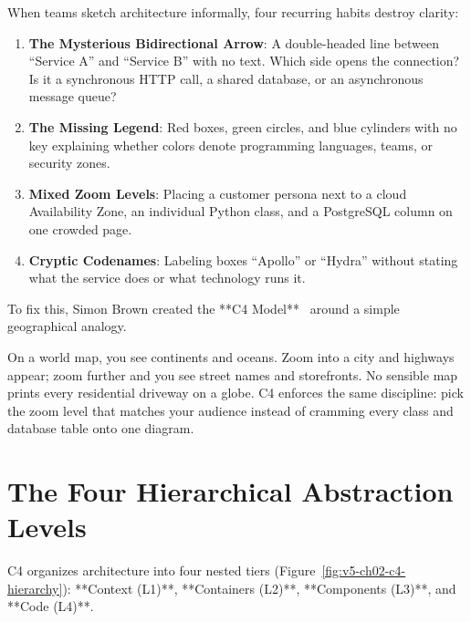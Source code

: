 When teams sketch architecture informally, four recurring habits destroy clarity:
\begin{enumerate}[leftmargin=18pt]
  \item \textbf{The Mysterious Bidirectional Arrow}: A double-headed line between ``Service A'' and ``Service B'' with no text. Which side opens the connection? Is it a synchronous HTTP call, a shared database, or an asynchronous message queue?
  \item \textbf{The Missing Legend}: Red boxes, green circles, and blue cylinders with no key explaining whether colors denote programming languages, teams, or security zones.
  \item \textbf{Mixed Zoom Levels}: Placing a customer persona next to a cloud Availability Zone, an individual Python class, and a PostgreSQL column on one crowded page.
  \item \textbf{Cryptic Codenames}: Labeling boxes ``Apollo'' or ``Hydra'' without stating what the service does or what technology runs it.
\end{enumerate}

To fix this, Simon Brown created the **C4 Model**~\cite{c4model} around a simple geographical analogy.

\begin{intuitionbox}
On a world map, you see continents and oceans. Zoom into a city and highways appear; zoom further and you see street names and storefronts. No sensible map prints every residential driveway on a globe. C4 enforces the same discipline: pick the zoom level that matches your audience instead of cramming every class and database table onto one diagram.
\end{intuitionbox}

\section{The Four Hierarchical Abstraction Levels}

C4 organizes architecture into four nested tiers (Figure~\ref{fig:v5-ch02-c4-hierarchy}): **Context (L1)**, **Containers (L2)**, **Components (L3)**, and **Code (L4)**.

